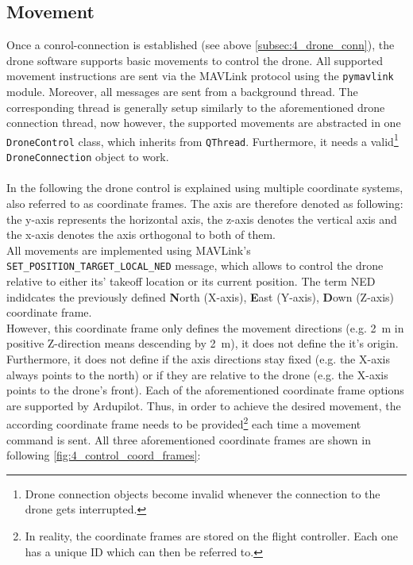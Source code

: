 \subsection{Movement}\label{subsec:4_drone_mvmnt}
Once a conrol-connection is established (see above
\autoref{subsec:4_drone_conn}), the drone software supports basic movements to
control the drone.
All supported movement instructions are sent via the MAVLink protocol using
the \texttt{pymavlink} module.
Moreover, all messages are sent from a background thread.
The corresponding thread is generally setup similarly to the aforementioned
drone connection thread, now however, the supported movements are
abstracted in one \texttt{DroneControl} class, which inherits from
\texttt{QThread}.
Furthermore, it needs a valid\footnote{Drone connection objects become
invalid whenever the connection to the drone gets interrupted.} 
\texttt{DroneConnection} object to work.\\\\
\noindent In the following the drone control is explained using multiple
coordinate systems, also referred to as coordinate frames.
The axis are therefore denoted as following: the y-axis represents the
horizontal axis, the z-axis denotes the vertical axis and the
x-axis denotes the axis orthogonal to both of them.\\
All movements are implemented using MAVLink's
\texttt{SET\_POSITION\_TARGET\_LOCAL\_NED} message, which allows to control
the drone relative to either its' takeoff location or its current position.
The term NED indidcates the previously defined \textbf{N}orth (X-axis),
\textbf{E}ast (Y-axis), \textbf{D}own (Z-axis) coordinate frame.\\
However, this coordinate frame only defines the movement directions (e.g. 2~m
in positive Z-direction means descending by 2~m), it does not define the it's
origin.
Furthermore, it does not define if the axis directions stay fixed (e.g. the
X-axis always points to the north) or if they are relative to the drone (e.g.
the X-axis points to the drone's front).
Each of the aforementioned coordinate frame options are supported by Ardupilot. %
Thus, in order to achieve the desired movement, the according coordinate
frame needs to be provided\footnote{In reality, the coordinate frames are
stored on the flight controller.
Each one has a unique ID which can then be referred to.} each time a movement
command is sent.
All three aforementioned coordinate frames are shown in following
\autoref{fig:4_control_coord_frames}:
